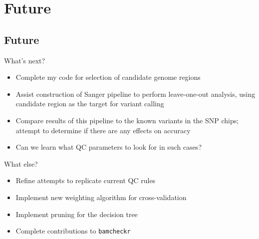 \documentclass{beamer}
\begin{document}
\section{Future}
\subsection{Future}

\begin{frame}[t]
    \begin{beamerboxesrounded}[shadow=true]{}
        \begin{center}
            What's next?
        \end{center}
    \end{beamerboxesrounded}
    \begin{itemize}
        \item Complete my code for selection of candidate genome regions
        \item Assist construction of Sanger pipeline to perform leave-one-out analysis,
            using candidate region as the target for variant calling
        \item Compare results of this pipeline to the known variants in the
            SNP chips; attempt to determine if there are any effects on accuracy
        \item Can we learn what QC parameters to look for in such cases?
    \end{itemize}

    \vskip 0.5cm

    \begin{beamerboxesrounded}[shadow=true]{}
        \begin{center}
            What else?
        \end{center}
    \end{beamerboxesrounded}
    \begin{itemize}
        \item Refine attempts to replicate current QC rules
        \item Implement new weighting algorithm for cross-validation
        \item Implement pruning for the decision tree
        \item Complete contributions to \texttt{bamcheckr}
    \end{itemize}
\end{frame}
\end{document}
